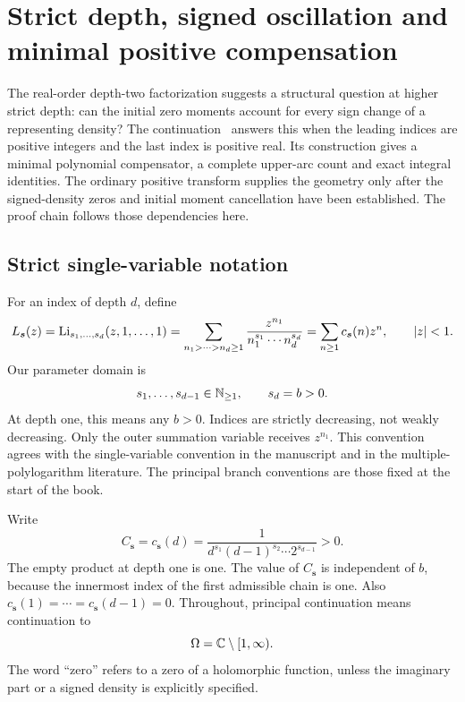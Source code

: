 \section{Strict depth, signed oscillation and minimal positive compensation}
\label{ado:sec:scope}
The real-order depth-two factorization suggests a structural question at
higher strict depth: can the initial zero moments account for every sign
change of a representing density? The continuation~\cite{ado:report}
answers this when the leading indices are positive integers and the last
index is positive real. Its construction gives a minimal polynomial
compensator, a complete upper-arc count and exact integral identities.
The ordinary positive transform supplies the geometry only after the
signed-density zeros and initial moment cancellation have been established.
The proof chain follows those dependencies here.
\newcommand{\adoNorm}[1]{\lVert#1\rVert}
\newcommand{\adoArg}{\operatorname{Arg}}
\subsection{Strict single-variable notation}
For an index of depth $d$, define
\begin{equation}\label{ado:eq:series}
 L_{\boldsymbol{s}}(z)=\operatorname{Li}_{s_1,\ldots,s_d}(z,1,\ldots,1)
 =\sum_{n_1>\cdots>n_d\ge1}
       \frac{z^{n_1}}{n_1^{s_1}\cdots n_d^{s_d}}
 =\sum_{n\ge1}c_{\boldsymbol{s}}(n)z^n,\qquad |z|<1.
\end{equation}
Our parameter domain is
\begin{equation}\label{ado:eq:domain}
 s_1,\ldots,s_{d-1}\in\mathbb N_{\ge1},\qquad s_d=b>0.
\end{equation}
At depth one, this means any $b>0$. Indices are strictly decreasing, not
weakly decreasing. Only the outer summation variable receives $z^{n_1}$.
This convention agrees with the single-variable convention in the
manuscript and in the multiple-polylogarithm literature. The principal branch conventions are those fixed at the start of the book.

Write
\begin{equation}\label{ado:eq:leading}
 C_{\boldsymbol{s}}=c_{\boldsymbol{s}}(d)
 =\frac{1}{d^{s_1}(d-1)^{s_2}\cdots 2^{s_{d-1}}}>0.
\end{equation}
The empty product at depth one is one. The value of $C_{\boldsymbol{s}}$ is
independent of $b$, because the innermost index of the first admissible
chain is one. Also $c_{\boldsymbol{s}}(1)=\cdots=c_{\boldsymbol{s}}(d-1)=0$.
Throughout, principal continuation means continuation to
\[
 \Omega=\mathbb C\setminus[1,\infty).
\]
The word ``zero'' refers to a zero of a holomorphic function, unless the
imaginary part or a signed density is explicitly specified.

